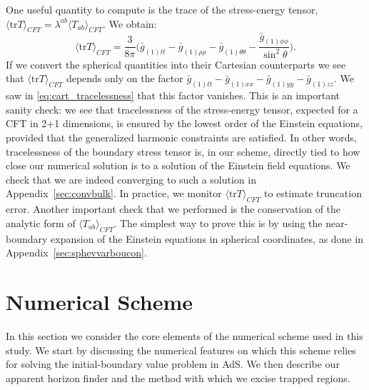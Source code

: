 \documentclass[a4paper,11pt]{article}
\numberwithin{equation}{section}
\begin{document}
One useful quantity to compute is the trace of the stress-energy tensor, $\langle \text{tr}T\rangle_{CFT}=\lambda^{ab} \langle T_{ab}\rangle_{CFT}$. We obtain:
\begin{equation}
\label{eq:tracecalc}
\langle \text{tr}T\rangle_{CFT}=\frac{3}{8\pi}\biggl(\bar{g}_{(1)tt}-\bar{g}_{(1)\rho\rho}-\bar{g}_{(1)\theta\theta}-\frac{\bar{g}_{(1)\phi\phi}}{\sin^2\theta}\biggr).
\end{equation}
If we convert the spherical quantities into their Cartesian counterparts 
we see that $\langle \text{tr}T\rangle_{CFT}$ depends only on the factor $\bar{g}_{(1)tt}-\bar{g}_{(1)xx}-\bar{g}_{(1)yy}-\bar{g}_{(1)zz}$. 
We saw in \eqref{eq:cart_tracelessness} that this factor vanishes.
This is an important sanity check: we see that tracelessness of the stress-energy tensor, expected for a CFT in 2+1 dimensions, is ensured by the lowest order of the Einstein equations, provided that the generalized harmonic constraints are satisfied.
In other words, tracelessness of the boundary stress tensor is, in our scheme, directly tied to how close our numerical solution is to a solution of the Einstein field equations. 
We check that we are indeed converging to such a solution in Appendix~\ref{sec:convbulk}.
In practice, we monitor $\langle \text{tr}T\rangle_{CFT}$ to estimate truncation error.
Another important check that we performed is the conservation of the analytic form of $\langle T_{ab}\rangle_{CFT}$. 
The simplest way to prove this is by using the near-boundary expansion of the Einstein equations in spherical coordinates, as done in Appendix~\ref{sec:sphevvarboucon}.


\section{Numerical Scheme}\label{sec:numerical_scheme}

In this section we consider the core elements of the numerical scheme used in this study.
We start by discussing the numerical features on which this scheme relies for solving the initial-boundary value problem in AdS.
We then describe our apparent horizon finder and the method with which we excise trapped regions.
\end{document}
